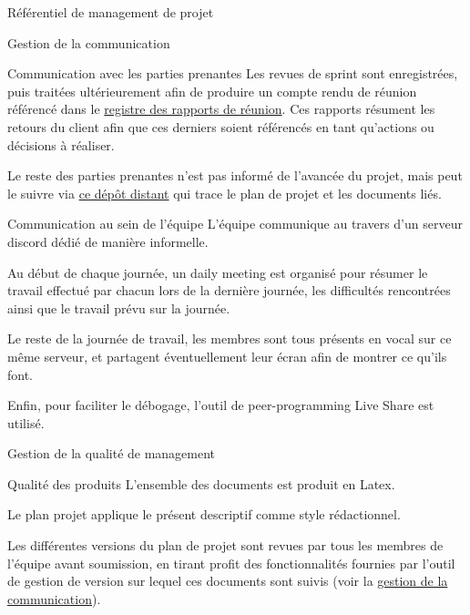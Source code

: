 \documentclass[]{article}
\begin{document}
{\begin{section}{\label{sec:Référentiel de management de projet}Référentiel de management de projet}
\begin{subsection}{\label{sec:Gestion de la communication}Gestion de la communication}
\begin{subsubsection}{\label{sec:Communication avec les parties prenantes}Communication avec les parties prenantes}
             Les revues de sprint sont enregistrées, puis traitées ultérieurement afin de produire un compte rendu de réunion référencé dans le \href{documents/Registre_des_rapports_de_réunion.pdf}{registre des rapports de réunion}. Ces rapports résument les retours du client afin que ces derniers soient référencés en tant qu’actions ou décisions à réaliser.

             Le reste des parties prenantes n'est pas informé de l’avancée du projet, mais peut le suivre via \href{https://github.com/Szyckaa/UE-PROJET-DOCS-GESTION}{ce dépôt distant} qui trace le plan de projet et les documents liés.
         \end{subsubsection}

         \newpage

         \begin{subsubsection}{\label{sec:Communication au sein de l'équipe}Communication au sein de l'équipe}
             L’équipe communique au travers d’un serveur discord dédié de manière informelle.

             Au début de chaque journée, un daily meeting est organisé pour résumer le travail effectué par chacun lors de la dernière journée, les difficultés rencontrées ainsi que le travail prévu sur la journée.

             Le reste de la journée de travail, les membres sont tous présents en vocal sur ce même serveur, et partagent éventuellement leur écran afin de montrer ce qu’ils font.

             Enfin, pour faciliter le débogage, l’outil de peer-programming Live Share est utilisé.
         \end{subsubsection}
     \end{subsection}

     \begin{subsection}{\label{sec:Gestion de la qualité de management}Gestion de la qualité de management}
         \begin{subsubsection}{\label{sec:Qualité des produits}Qualité des produits}
            L'ensemble des documents est produit en Latex.

            Le plan projet applique le présent descriptif comme style rédactionnel. 

             Les différentes versions du plan de projet sont revues par tous les membres de l’équipe avant soumission, en tirant profit des fonctionnalités fournies par l'outil de gestion de version sur lequel ces documents sont suivis (voir la \hyperref[sec:Communication avec les parties prenantes]{gestion de la communication}).


\end{subsubsection}
\end{subsection}
\end{section}}
\end{document}
